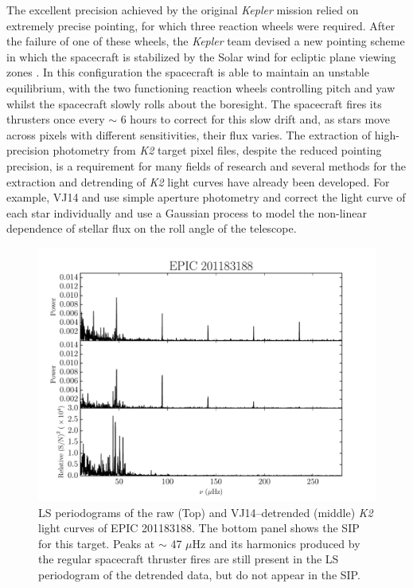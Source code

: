 \documentclass[useAMS, usenatbib, preprint, 12pt]{aastex}
\begin{document}
The excellent precision achieved by the original {\it Kepler} mission relied
on extremely precise pointing, for which three reaction wheels were required.
After the failure of one of these wheels, the {\it Kepler} team devised a new
pointing scheme in which the spacecraft is stabilized by the Solar wind for
ecliptic plane viewing zones \citep{Howell2014}.
In this configuration the spacecraft is able to maintain an unstable
equilibrium, with the two functioning reaction wheels controlling pitch and
yaw whilst the spacecraft slowly rolls about the boresight.
The spacecraft fires its thrusters once every $\sim$ 6 hours
\citep[][hereafter VJ14]{Vanderburg2014} to correct for
this slow drift and, as stars move across pixels with different sensitivities,
their flux varies.
The extraction of high-precision photometry from {\it K2} target pixel files,
despite the reduced pointing precision, is a requirement for many fields of
research and several methods for the extraction and detrending of {\it K2}
light curves have already been developed.
For example, VJ14 and \citet{Crossfield2015}
use simple aperture photometry and correct the light curve of each star
individually and \citet{Aigrain2015} use a Gaussian process to model the
non-linear dependence of stellar flux on the roll angle of the telescope.

\begin{figure}[p]
\begin{center}
\includegraphics[width=6in, clip=true]{rawvbg_201183188.pdf}
\caption{LS periodograms of the raw (Top) and VJ14--detrended (middle) {\it K2}
	 light curves of EPIC 201183188.
	 The bottom panel shows the SIP for this target.
	 Peaks at $\sim$ 47 $\mu$Hz and its harmonics produced by the regular
	 spacecraft thruster fires are still present in the LS periodogram of
	 the detrended data, but do not appear in the SIP.}
\label{fig:raw}
\end{center}
\end{figure}
\end{document}
